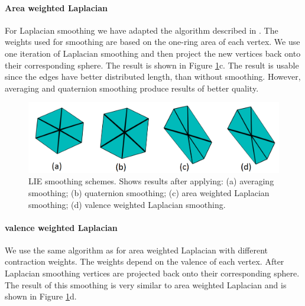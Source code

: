 \paragraph{Area weighted Laplacian}
For Laplacian smoothing we have adapted the algorithm described in \cite{laplac}. The weights used for smoothing are based on the one-ring area of each vertex. We use one iteration of Laplacian smoothing and then project the new vertices back onto their corresponding sphere. The result is shown in Figure \ref{fig:smoothing_ilu}c. The result is usable since the edges have better distributed length, than without smoothing. However, averaging and quaternion smoothing produce results of better quality.

\begin{figure}[h]
    \centering
    \includegraphics[width=\textwidth]{images/smoothing_ilu.png}
    \caption[LIE smoothing schemes]{LIE smoothing schemes. Shows results after applying: (a) averaging smoothing; (b) quaternion smoothing; (c) area weighted Laplacian smoothing; (d) valence weighted Laplacian smoothing.}
    \label{fig:smoothing_ilu}
\end{figure}

\paragraph{valence weighted Laplacian}
We use the same algorithm as for area weighted Laplacian with different contraction weights. The weights depend on the valence of each vertex. After Laplacian smoothing vertices are projected back onto their corresponding sphere. The result of this smoothing is very similar to area weighted Laplacian and is shown in Figure \ref{fig:smoothing_ilu}d.

